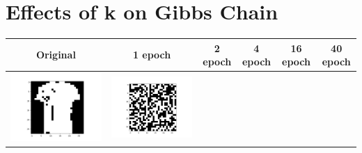 \documentclass[12pt]{report}
\begin{document}
\section{Effects of k on Gibbs Chain}
\begin{table}[H]
  \centering
  \begin{tabular}{ | c | c | c | c | c | c |}
    \hline
    \textbf{Original} & \textbf{1 epoch} & \textbf{2 epoch} & \textbf{4 epoch} & \textbf{16 epoch}  & \textbf{40 epoch} \\ \hline
    \begin{minipage}{.3\textwidth}
      \includegraphics[scale=0.2]{BM_avisual.png}
    \end{minipage} & 
    \begin{minipage}{.3\textwidth}
      \includegraphics[scale=0.2]{BM_a1.png}

\end{minipage}
\end{tabular}
\end{table}
\end{document}
